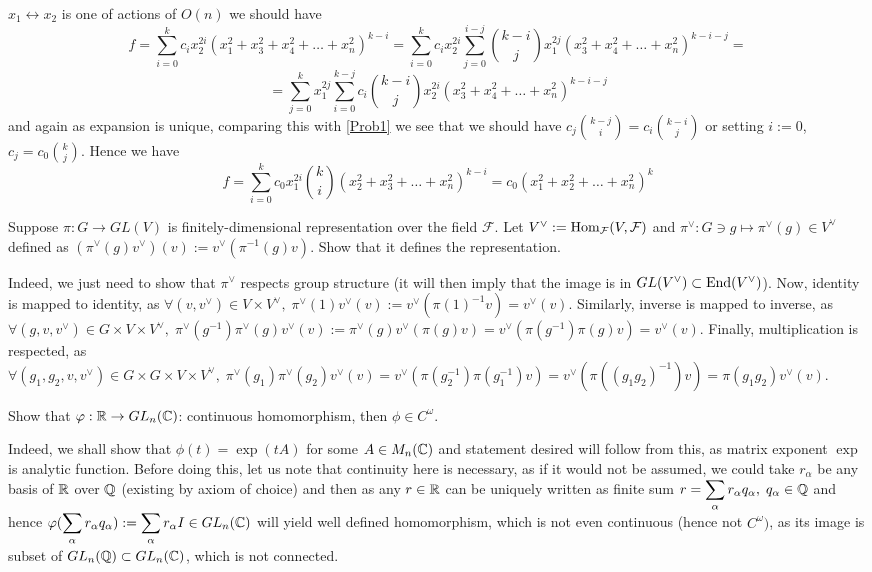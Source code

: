 \documentclass[8pt]{article} %
\newcommand{\Hom}{\mbox{\normalfont{Hom}}}
\newcommand{\End}{\mbox{\normalfont{End}}}
\providecommand{\F}{\mathcal{F}}
\newcommand{\myprobshort}[2]{\begin{myprob}[#1]#2\end{myprob}}
\begin{document}
$x_1\leftrightarrow x_2$ is one of actions of $O(n)$ we should have
\[f=\sum_{ i=0 }^kc_ix_2^{ 2i }(x_1^2+x_3^2+x_4^2+\hdots+x_n^2)^{ k-i }=\sum_{ i=0 }^kc_ix_2^{ 2i }\sum_{ j=0 }^{ i-j }
\binom{ k-i }{ j }x_1^{ 2j }(x_3^2+x_4^2+\dots+x_n^2)^{ k-i-j }=\]
\[=\sum_{ j=0 }^kx_1^{ 2j }\sum_{ i=0 }^{ k-j }c_i\binom{ k-i }{ j }x_2^{ 2i }(x_3^2+x_4^2+\dots+x_n^2)^{ k-i-j }\]
and again as expansion is unique, comparing this with \ref{Prob1}
we see that we should have $c_j\binom{ k-j }{ i }=c_i\binom{ k-i }{j}$ or setting $i:=0$, $c_j=c_0\binom{ k }{ j }$. Hence we have
\[f=\sum_{i=0}^kc_0x_1^{ 2i }\binom{ k }{ i }(x_2^2+x_3^2+\hdots+x_n^2)^{ k-i }=c_0(x_1^2+x_2^2+\dots+x_n^2)^k\]
\myprobshort{April 7}{
	Suppose $\pi:G\to GL(V)$ is finitely-dimensional representation over the field $\F$. Let $V^\vee:=\Hom_\F(V,\F)$ and
	$\pi^\vee:G\ni g\mapsto\pi^\vee(g)\in V^\vee$ defined as $(\pi^\vee(g)v^\vee)(v):=v^\vee(\pi^{ -1 }(g)v)$. Show
that it defines the representation.}
Indeed, we just need to show that $\pi^\vee$ respects group structure (it will then imply that the image is in $GL(V^\vee)\subset
\End(V^\vee)$). Now, identity is mapped to identity, as $\forall(v,v^\vee)\in V\times V^\vee,\;
\pi^\vee(1)v^\vee(v):=v^\vee(\pi(1)^{ -1 }v)=v^\vee(v)$. Similarly, inverse is mapped to inverse, as $\forall(g,v,v^\vee)\in G\times
V\times V^\vee,\;\pi^\vee(g^{ -1 })\pi^\vee(g)v^\vee(v):=\pi^\vee(g)v^\vee(\pi(g)v)=v^\vee(\pi(g^{ -1 })\pi(g)v)=v^\vee(v)$.
Finally, multiplication is respected, as $\forall(g_1,g_2,v,v^\vee)\in G\times G\times V\times V^\vee,\;\pi^\vee(g_1)\pi^\vee(g_2)
v^\vee(v)=v^\vee(\pi(g_2^{ -1 })\pi(g_1^{ -1 })v)=v^\vee(\pi((g_1g_2)^{ -1 })v)=\pi(g_1g_2)v^\vee(v)$.
\myprobshort{April 7}{Show that $\varphi:\mathbb{R}\to GL_n(\mathbb{C})$: continuous homomorphism, then $\phi\in C^\omega$.}
Indeed, we shall show that $\phi(t)=\exp(tA)$ for some $A\in M_n(\mathbb{C})$ and statement desired will follow from this, as matrix
exponent $\exp$ is analytic function. Before doing this, let us note that continuity here is necessary, as if it would
not be assumed, we could take ${ r_\alpha }$ be any basis of $\mathbb{R}$ over $\mathbb{Q}$ (existing by axiom of choice) and then as
any $r\in\mathbb{R}$ can be uniquely written as finite sum $r=\sum_\alpha r_\alpha q_\alpha,\;q_\alpha\in\Q$ and hence
$\phi(\sum_\alpha r_\alpha q_\alpha):=\sum_\alpha r_\alpha I\in GL_n(\C)$ will yield well defined homomorphism,
which is not even continuous (hence not $C^\omega)$, as its image is subset of $GL_n(\mathbb{Q})\subset GL_n(\mathbb{C})$, which is not connected.
\end{document}
